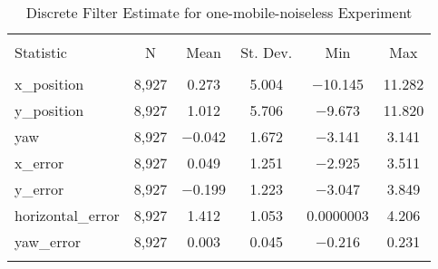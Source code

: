 
\begin{table}[h] \centering 
  \caption{Discrete Filter Estimate for one-mobile-noiseless Experiment} 
  \label{tab:one_mobile_noiseless_discrete_summary} 
\begin{tabular}{@{\extracolsep{5pt}}lccccc} 
\\[-1.8ex]\hline 
\hline \\[-1.8ex] 
Statistic & \multicolumn{1}{c}{N} & \multicolumn{1}{c}{Mean} & \multicolumn{1}{c}{St. Dev.} & \multicolumn{1}{c}{Min} & \multicolumn{1}{c}{Max} \\ 
\hline \\[-1.8ex] 
x\_position & 8,927 & 0.273 & 5.004 & $-$10.145 & 11.282 \\ 
y\_position & 8,927 & 1.012 & 5.706 & $-$9.673 & 11.820 \\ 
yaw & 8,927 & $-$0.042 & 1.672 & $-$3.141 & 3.141 \\ 
x\_error & 8,927 & 0.049 & 1.251 & $-$2.925 & 3.511 \\ 
y\_error & 8,927 & $-$0.199 & 1.223 & $-$3.047 & 3.849 \\ 
horizontal\_error & 8,927 & 1.412 & 1.053 & 0.0000003 & 4.206 \\ 
yaw\_error & 8,927 & 0.003 & 0.045 & $-$0.216 & 0.231 \\ 
\hline \\[-1.8ex] 
\end{tabular} 
\end{table} 

